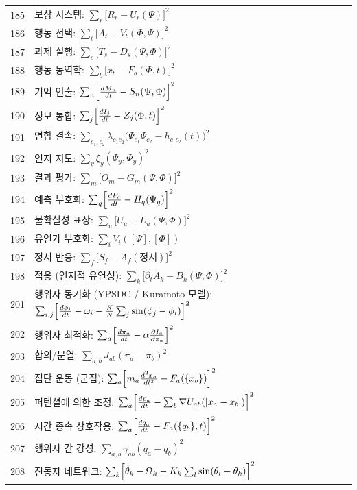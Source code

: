 \documentclass[11pt,a4paper]{article}
\begin{document}
\begin{longtable}{r l}
		185 & 보상 시스템: $\sum_r\bigl[R_r - U_r(\Psi)\bigr]^2$ \\
		186 & 행동 선택: $\sum_t\bigl[A_t - V_t(\Phi,\Psi)\bigr]^2$ \\
		187 & 과제 실행: $\sum_s\bigl[T_s - D_s(\Psi,\Phi)\bigr]^2$ \\
		188 & 행동 동역학: $\sum_b\bigl[\dot x_b - F_b(\Phi,t)\bigr]^2$ \\
		189 & 기억 인출: $\sum_n\Bigl[\frac{dM_n}{dt} - S_n(\Psi,\Phi)\Bigr]^2$ \\
		190 & 정보 통합: $\sum_j\Bigl[\frac{dI_j}{dt} - Z_j(\Phi,t)\Bigr]^2$ \\
		191 & 연합 결속: $\sum_{c_1,c_2}\lambda_{c_1c_2}\bigl(\Psi_{c_1}\Psi_{c_2} - h_{c_1c_2}(t)\bigr)^2$ \\
		192 & 인지 지도: $\sum_y\xi_y(\Psi_y,\Phi_y)^2$ \\
		193 & 결과 평가: $\sum_m\bigl[O_m - G_m(\Psi,\Phi)\bigr]^2$ \\
		194 & 예측 부호화: $\sum_q\Bigl[\frac{dP_q}{dt} - H_q(\Psi_q)\Bigr]^2$ \\
		195 & 불확실성 표상: $\sum_u\bigl[U_u - L_u(\Psi,\Phi)\bigr]^2$ \\
		196 & 유인가 부호화: $\sum_i V_i([\Psi],[\Phi])$ \\
		197 & 정서 반응: $\sum_f\bigl[S_f - A_f(\text{정서})\bigr]^2$ \\
		198 & 적응 (인지적 유연성): $\sum_k\bigl[\partial_t A_k - B_k(\Psi,\Phi)\bigr]^2$ \\
		201 & 행위자 동기화 (YPSDC / Kuramoto 모델): $\sum_{i,j}\Bigl[\frac{d\phi_i}{dt} - \omega_i - \frac{K}{N}\sum_j\sin(\phi_j-\phi_i)\Bigr]^2$ \\
		202 & 행위자 최적화: $\sum_a\Bigl[\frac{d\pi_a}{dt} - \alpha\frac{\partial I_a}{\partial\pi_a}\Bigr]^2$ \\
		203 & 합의/분열: $\sum_{a,b}J_{ab}(\pi_a - \pi_b)^2$ \\
		204 & 집단 운동 (군집): $\sum_a\Bigl[m_a\frac{d^2 x_a}{dt^2} - F_a(\{x_b\})\Bigr]^2$ \\
		205 & 퍼텐셜에 의한 조정: $\sum_a\Bigl[\frac{dp_a}{dt} - \sum_b\nabla U_{ab}(|x_a-x_b|)\Bigr]^2$ \\
		206 & 시간 종속 상호작용: $\sum_a\Bigl[\frac{dq_a}{dt} - F_a(\{q_b\},t)\Bigr]^2$ \\
		207 & 행위자 간 강성: $\sum_{a,b}\gamma_{ab}(q_a - q_b)^2$ \\
		208 & 진동자 네트워크: $\sum_k\Bigl[\dot\theta_k - \Omega_k - K_k\sum_l\sin(\theta_l-\theta_k)\Bigr]^2$ \\

\end{longtable}
\end{document}
